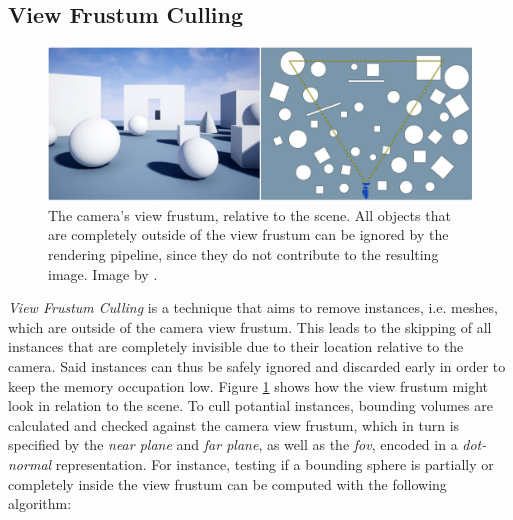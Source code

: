 \subsection*{View Frustum Culling} \label{subsec-view-frustum-culling}

\begin{figure}[h]
    \centering
    \includegraphics[width=\linewidth]{images/graphics/view-frustum-culling.jpg}
    \caption{The camera's view frustum, relative to the scene. All objects that are completely outside of 
    the view frustum can be ignored by the rendering pipeline, since they do not contribute to the resulting image.
    Image by \cite{Pan2020}.}
    \label{fig:view-frustum-culling}
\end{figure}

\noindent
\emph{View Frustum Culling} is a technique that aims to remove instances, i.e. meshes, which are outside of the camera 
view frustum. This leads to the skipping of all instances that are completely invisible due to their location relative to 
the camera. Said instances can thus be safely ignored and discarded early in order to keep the memory occupation low. 
Figure \ref{fig:view-frustum-culling} shows how the view frustum might look in relation to the scene. 
To cull potantial instances, bounding volumes are calculated and checked against the camera view frustum, which in turn 
is specified by the \emph{near plane} and \emph{far plane}, as well as the \emph{fov}, encoded in a \emph{dot-normal}
representation. For instance, testing if a bounding sphere is partially or completely inside the view frustum can be 
computed with the following algorithm: \\

    
